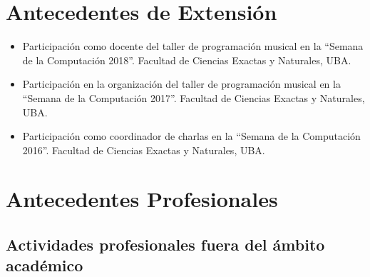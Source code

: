 \documentclass[a4paper,10pt]{article}
\begin{document}
\section{Antecedentes de Extensión}

\begin{itemize}
    \item Participación como docente del taller de programación musical en la
        “Semana de la Computación 2018”.
        Facultad de Ciencias Exactas y Naturales, UBA.
    \item Participación en la organización del taller de programación musical
        en la “Semana de la Computación 2017”. Facultad de Ciencias Exactas y
        Naturales, UBA. 
    \item Participación como coordinador de charlas en la “Semana de la
        Computación 2016”. Facultad de Ciencias Exactas y Naturales, UBA. 
\end{itemize}

\section{Antecedentes Profesionales}

\subsection{Actividades profesionales fuera del ámbito académico}
\end{document}

